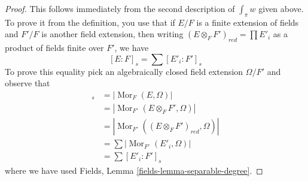\documentclass[10pt,a4paper]{amsart}
\theoremstyle{plain}
\theoremstyle{definition}
\theoremstyle{remark}
\numberwithin{equation}{subsection}
\def\Mor{\mathop{\mathrm{Mor}}\nolimits}
\begin{document}
\begin{proof}
This follows immediately from the second description of $\int_\pi w$
given above. To prove it from the definition, you use that if
$E/F$ is a finite extension of fields and $F'/F$ is another field extension,
then writing $(E \otimes_F F')_{red} = \prod E'_i$ as a product of fields
finite over $F'$, we have
$$
[E : F]_s = \sum [E'_i : F']_s
$$
To prove this equality pick an algebraically closed field
extension $\Omega/F'$ and observe that
\begin{align*}
[E : F]_s
& =
|\Mor_F(E, \Omega)| \\
& =
|\Mor_{F'}(E \otimes_F F', \Omega)| \\
& =
|\Mor_{F'}((E \otimes_F F')_{red}, \Omega)| \\
& =
\sum |\Mor_{F'}(E'_i, \Omega)| \\
& =
\sum [E'_i : F']_s
\end{align*}
where we have used Fields, Lemma \ref{fields-lemma-separable-degree}.
\end{proof}
\end{document}
